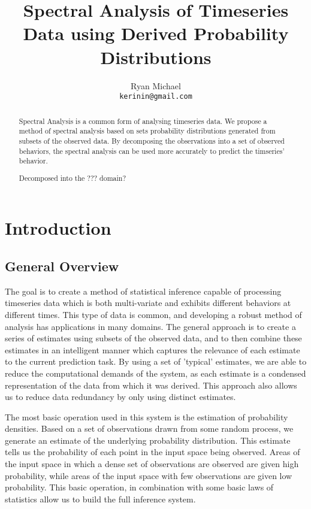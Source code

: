 \documentclass[10pt]{article}
\begin{document}
\title{Spectral Analysis of Timeseries Data using Derived Probability Distributions}
\author{Ryan Michael\\ \texttt{kerinin@gmail.com}}
\maketitle

\begin{abstract}
Spectral Analysis is a common form of analysing timeseries data.  We propose a method of spectral analysis based on sets probability distributions generated from subsets of the observed data.  By decomposing the observations into a set of observed behaviors, the spectral analysis can be used more accurately to predict the timseries' behavior.

Decomposed into the ??? domain?
\end{abstract}

\section{Introduction}

\subsection{General Overview}
The goal is to create a method of statistical inference capable of processing timeseries data which is both multi-variate and exhibits different behaviors at different times.  This type of data is common, and developing a robust method of analysis has applications in many domains.  The general approach is to create a series of estimates using subsets of the observed data, and to then combine these estimates in an intelligent manner which captures the relevance of each estimate to the current prediction task.  By using a set of 'typical' estimates, we are able to reduce the computational demands of the system, as each estimate is a condensed representation of the data from which it was derived.  This approach also allows us to reduce data redundancy by only using distinct estimates.

The most basic operation used in this system is the estimation of probability densities.  Based on a set of observations drawn from some random process, we generate an estimate of the underlying probability distribution.  This estimate tells us the probability of each point in the input space being observed.  Areas of the input space in which a dense set of observations are observed are given high probability, while areas of the input space with few observations are given low probability.  This basic operation, in combination with some basic laws of statistics allow us to build the full inference system.
\end{document}
